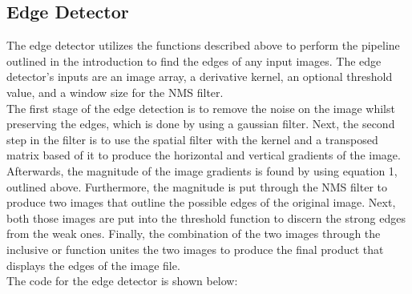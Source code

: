 \documentclass{article}
\begin{document}
	\subsection{Edge Detector}
	
	The edge detector utilizes the functions described above to perform the pipeline outlined in the introduction to find the edges of any input images. The edge detector's inputs are an image array, a derivative kernel, an optional threshold value, and a window size for the NMS filter. \\
	
	The first stage of the edge detection is to remove the noise on the image whilst preserving the edges, which is done by using a gaussian filter. Next, the second step in the filter is to use the spatial filter with the kernel and a transposed matrix based of it to produce the horizontal and vertical gradients of the image. Afterwards, the magnitude of the image gradients is found by using equation 1, outlined above. Furthermore, the magnitude is put through the NMS filter to produce two images that outline the possible edges of the original image. Next, both those images are put into the threshold function to discern the strong edges from the weak ones. Finally, the combination of the two images through the inclusive or function unites the two images to produce the final product that displays the edges of the image file.\\
	
	The code for the edge detector is shown below:\\
	
\end{document}

